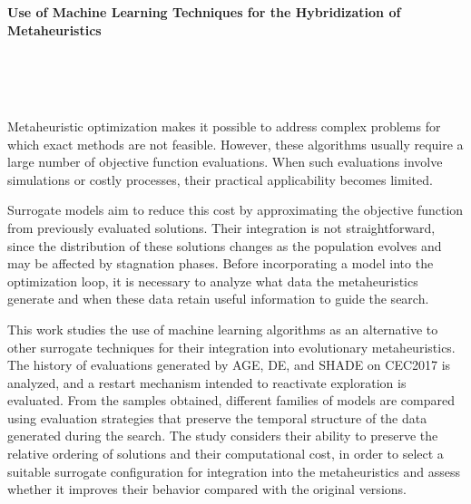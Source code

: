 \cleardoublepage

\thispagestyle{empty}

\begin{center}
       {\large\bfseries Use of Machine Learning Techniques for the Hybridization of Metaheuristics}\\
\end{center}
\begin{center}
       \myName\\
\end{center}

\vspace{0.7cm}
\\

\\

Metaheuristic optimization makes it possible to address complex problems for which exact methods are not feasible. However, these algorithms usually require a large number of objective function evaluations. When such evaluations involve simulations or costly processes, their practical applicability becomes limited.

Surrogate models aim to reduce this cost by approximating the objective function from previously evaluated solutions. Their integration is not straightforward, since the distribution of these solutions changes as the population evolves and may be affected by stagnation phases. Before incorporating a model into the optimization loop, it is necessary to analyze what data the metaheuristics generate and when these data retain useful information to guide the search.

This work studies the use of machine learning algorithms as an alternative to other surrogate techniques for their integration into evolutionary metaheuristics. The history of evaluations generated by AGE, DE, and SHADE on CEC2017 is analyzed, and a restart mechanism intended to reactivate exploration is evaluated. From the samples obtained, different families of models are compared using evaluation strategies that preserve the temporal structure of the data generated during the search. The study considers their ability to preserve the relative ordering of solutions and their computational cost, in order to select a suitable surrogate configuration for integration into the metaheuristics and assess whether it improves their behavior compared with the original versions.

